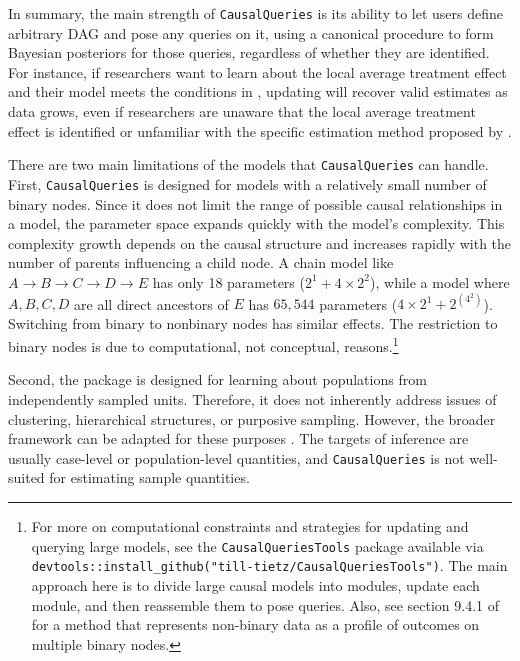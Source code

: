\documentclass[
  11pt,
  article]{jss}
\begin{document}
In summary, the main strength of \texttt{CausalQueries} is its ability
to let users define arbitrary DAG and pose any queries on it, using a
canonical procedure to form Bayesian posteriors for those queries,
regardless of whether they are identified. For instance, if researchers
want to learn about the local average treatment effect and their model
meets the conditions in \citet{angrist_identification_1996}, updating
will recover valid estimates as data grows, even if researchers are
unaware that the local average treatment effect is identified or
unfamiliar with the specific estimation method proposed by
\citet{angrist_identification_1996}.

There are two main limitations of the models that \texttt{CausalQueries}
can handle. First, \texttt{CausalQueries} is designed for models with a
relatively small number of binary nodes. Since it does not limit the
range of possible causal relationships in a model, the parameter space
expands quickly with the model's complexity. This complexity growth
depends on the causal structure and increases rapidly with the number of
parents influencing a child node. A chain model like
\(A \rightarrow B \rightarrow C \rightarrow D \rightarrow E\) has only
18 parameters (\(2^1 + 4\times 2^2\)), while a model where
\(A, B, C, D\) are all direct ancestors of \(E\) has \(65,544\)
parameters (\(4\times 2^1 + 2^{(4^2)}\)). Switching from binary to
nonbinary nodes has similar effects. The restriction to binary nodes is
due to computational, not conceptual, reasons.\footnote{For more on
  computational constraints and strategies for updating and querying
  large models, see the \texttt{CausalQueriesTools} package available
  via
  \texttt{devtools::install\_github("till-tietz/CausalQueriesTools")}.
  The main approach here is to divide large causal models into modules,
  update each module, and then reassemble them to pose queries. Also,
  see section 9.4.1 of \citet{humphreys_integrated_2023} for a method
  that represents non-binary data as a profile of outcomes on multiple
  binary nodes.}

Second, the package is designed for learning about populations from
independently sampled units. Therefore, it does not inherently address
issues of clustering, hierarchical structures, or purposive sampling.
However, the broader framework can be adapted for these purposes
\citep[see section 9.4 of][]{humphreys_integrated_2023}. The targets of
inference are usually case-level or population-level quantities, and
\texttt{CausalQueries} is not well-suited for estimating sample
quantities.
\end{document}
